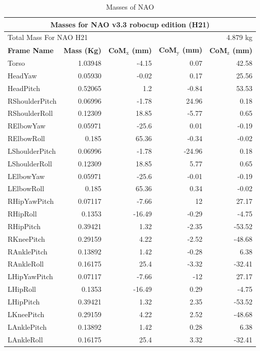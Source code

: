 \begin{table}[t!]
\caption{Masses of NAO}
\begin{tabular}{|l|r|r|r|r|}
\hline
\multicolumn{5}{|c|}{\textbf{Masses for NAO v3.3 robocup edition (H21)}} \\ \hline
\multicolumn{3}{|l|}{Total Mass For NAO H21} & \multicolumn{2}{|r|}{4.879 kg}\\ \hline
\textbf{Frame Name} & \textbf{Mass (Kg)} & \textbf{CoM$_{\text{x}}$ (mm)} & \textbf{CoM$_{\text{y}}$ (mm)} & \textbf{CoM$_{\text{z}}$ (mm)}\\ \hline
Torso & 1.03948 & -4.15 & 0.07 & 42.58 \\ \hline
HeadYaw & 0.05930 & -0.02 & 0.17 & 25.56 \\ \hline
HeadPitch & 0.52065 & 1.2 & -0.84 & 53.53 \\ \hline
RShoulderPitch & 0.06996 & -1.78 & 24.96 & 0.18 \\ \hline
RShoulderRoll & 0.12309 & 18.85 & -5.77 & 0.65 \\ \hline
RElbowYaw & 0.05971 & -25.6 & 0.01 & -0.19 \\ \hline
RElbowRoll & 0.185 & 65.36 & -0.34 & -0.02 \\ \hline
LShoulderPitch & 0.06996 & -1.78 & -24.96 & 0.18 \\ \hline
LShoulderRoll & 0.12309 & 18.85 & 5.77 & 0.65 \\ \hline
LElbowYaw & 0.05971 & -25.6 & -0.01 & -0.19 \\ \hline
LElbowRoll & 0.185 & 65.36 & 0.34 & -0.02 \\ \hline
RHipYawPitch & 0.07117 & -7.66 & 12 & 27.17 \\ \hline
RHipRoll & 0.1353 & -16.49 & -0.29 & -4.75 \\ \hline
RHipPitch & 0.39421 & 1.32 & -2.35 & -53.52 \\ \hline
RKneePitch & 0.29159 & 4.22 & -2.52 & -48.68 \\ \hline
RAnklePitch & 0.13892 & 1.42 & -0.28 & 6.38 \\ \hline
RAnkleRoll & 0.16175 & 25.4 & -3.32 & -32.41 \\ \hline
LHipYawPitch & 0.07117 & -7.66 & -12 & 27.17 \\ \hline
LHipRoll & 0.1353 & -16.49 & 0.29 & -4.75 \\ \hline
LHipPitch & 0.39421 & 1.32 & 2.35 & -53.52 \\ \hline
LKneePitch & 0.29159 & 4.22 & 2.52 & -48.68 \\ \hline
LAnklePitch & 0.13892 & 1.42 & 0.28 & 6.38 \\ \hline
LAnkleRoll & 0.16175 & 25.4 & 3.32 & -32.41 \\ \hline
\end{tabular}
\label{tab:Masses of NAO}
\end{table}

